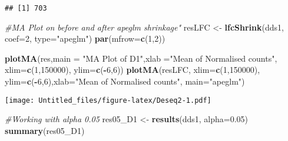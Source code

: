 \documentclass[]{article}
\newenvironment{Shaded}{\begin{snugshade}}{\end{snugshade}}
\newcommand{\CommentTok}[1]{\textcolor[rgb]{0.56,0.35,0.01}{\textit{#1}}}
\newcommand{\DataTypeTok}[1]{\textcolor[rgb]{0.13,0.29,0.53}{#1}}
\newcommand{\DecValTok}[1]{\textcolor[rgb]{0.00,0.00,0.81}{#1}}
\newcommand{\FloatTok}[1]{\textcolor[rgb]{0.00,0.00,0.81}{#1}}
\newcommand{\KeywordTok}[1]{\textcolor[rgb]{0.13,0.29,0.53}{\textbf{#1}}}
\newcommand{\NormalTok}[1]{#1}
\newcommand{\OperatorTok}[1]{\textcolor[rgb]{0.81,0.36,0.00}{\textbf{#1}}}
\newcommand{\OtherTok}[1]{\textcolor[rgb]{0.56,0.35,0.01}{#1}}
\newcommand{\StringTok}[1]{\textcolor[rgb]{0.31,0.60,0.02}{#1}}
\begin{document}
\begin{Shaded}
\end{Shaded}

\begin{verbatim}
## [1] 703
\end{verbatim}

\begin{Shaded}
\begin{Highlighting}[]
\CommentTok{#MA Plot on before and after apeglm shrinkage"}
\NormalTok{resLFC <-}\StringTok{ }\KeywordTok{lfcShrink}\NormalTok{(dds1, }\DataTypeTok{coef=}\DecValTok{2}\NormalTok{, }\DataTypeTok{type=}\StringTok{"apeglm"}\NormalTok{)}
\KeywordTok{par}\NormalTok{(}\DataTypeTok{mfrow=}\KeywordTok{c}\NormalTok{(}\DecValTok{1}\NormalTok{,}\DecValTok{2}\NormalTok{))}

\KeywordTok{plotMA}\NormalTok{(res,}\DataTypeTok{main =} \StringTok{"MA Plot of D1"}\NormalTok{,}\DataTypeTok{xlab =}\StringTok{"Mean of Normalised counts"}\NormalTok{,}
       \DataTypeTok{xlim=}\KeywordTok{c}\NormalTok{(}\DecValTok{1}\NormalTok{,}\DecValTok{150000}\NormalTok{), }\DataTypeTok{ylim=}\KeywordTok{c}\NormalTok{(}\OperatorTok{-}\DecValTok{6}\NormalTok{,}\DecValTok{6}\NormalTok{))}
\KeywordTok{plotMA}\NormalTok{(resLFC, }\DataTypeTok{xlim=}\KeywordTok{c}\NormalTok{(}\DecValTok{1}\NormalTok{,}\DecValTok{150000}\NormalTok{), }\DataTypeTok{ylim=}\KeywordTok{c}\NormalTok{(}\OperatorTok{-}\DecValTok{6}\NormalTok{,}\DecValTok{6}\NormalTok{),}\DataTypeTok{xlab=}\StringTok{"Mean of Normalised counts"}\NormalTok{, }\DataTypeTok{main=}\StringTok{"apeglm"}\NormalTok{)}
\end{Highlighting}
\end{Shaded}

\texttt{[image: Untitled\_files/figure-latex/Deseq2-1.pdf]}

\begin{Shaded}
\begin{Highlighting}[]
\CommentTok{#Working with alpha 0.05}
\NormalTok{res05_D1 <-}\StringTok{ }\KeywordTok{results}\NormalTok{(dds1, }\DataTypeTok{alpha=}\FloatTok{0.05}\NormalTok{)}
\KeywordTok{summary}\NormalTok{(res05_D1)}
\end{Highlighting}
\end{Shaded}
\end{document}
